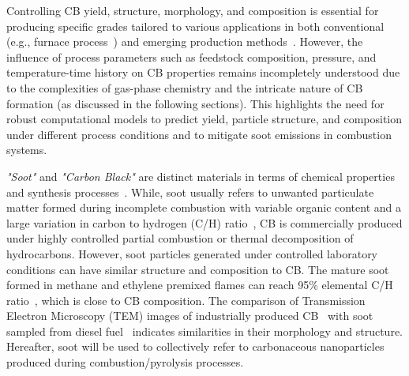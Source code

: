 
Controlling CB yield, structure, morphology, and composition is essential for producing specific grades tailored to various applications in both conventional (e.g., furnace process~\citep{dames2023plasma}) and emerging production methods~\citep{li2017experimental, fulcheri2023energy, patlolla2023review}. However, the influence of process parameters such as feedstock composition, pressure, and temperature-time history on CB properties remains incompletely understood due to the complexities of gas-phase chemistry and the intricate nature of CB formation (as discussed in the following sections). This highlights the need for robust computational models to predict yield, particle structure, and composition under different process conditions and to mitigate soot emissions in combustion systems.

\textit{"Soot"} and \textit{"Carbon Black"} are distinct materials in terms of chemical properties and synthesis processes~\cite{watson2001carbon}. While, soot usually refers to unwanted particulate matter formed during incomplete combustion with variable organic content and a large variation in carbon to hydrogen (C/H) ratio~\citep{watson2001carbon}, CB is commercially produced under highly controlled partial combustion or thermal decomposition of hydrocarbons. However, soot particles generated under controlled laboratory conditions can have similar structure and composition to CB. The mature soot formed in methane and ethylene premixed flames can reach 95\% elemental C/H ratio~\cite{russo2015dehydrogenation}, which is close to CB composition. The comparison of Transmission Electron Microscopy (TEM) images of industrially produced CB~\citep{singh2018nanostructure} with soot sampled from diesel fuel~\citep{vander2007hrtem, lapuerta2017morphological} indicates similarities in their morphology and structure. Hereafter, soot will be used to collectively refer to carbonaceous nanoparticles produced during combustion/pyrolysis processes.

